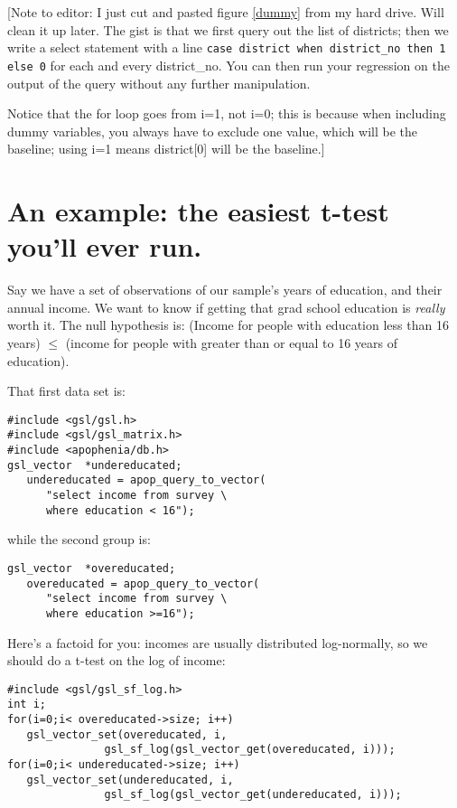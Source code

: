 
[Note to editor: I just cut and pasted figure \ref{dummy} from my hard drive. Will clean it up
later. The gist is that we first query out the list of districts; then we write a
select statement with a line {\tt case district when district\_no then 1 else 0} for
each and every district\_no. You can then run your regression on the output of the
query without any further manipulation.

Notice that the for loop goes from i=1, not i=0; this is because when including
dummy variables, you always have to exclude one value, which will be the baseline;
using i=1 means district[0] will be the baseline.]




\section{An example: the easiest t-test you'll ever run.}
Say we have a set of observations of our sample's years of education, and their annual income. We want to
know if getting that grad school education is {\it really} worth it. The null hypothesis is: (Income for
people with education less than 16 years) $\leq$ (income for people with greater than or equal to 16 years
of education).

That first data set is:
\begin{verbatim}
#include <gsl/gsl.h>
#include <gsl/gsl_matrix.h>
#include <apophenia/db.h>
gsl_vector	*undereducated;
   undereducated = apop_query_to_vector(
      "select income from survey \
      where education < 16");
\end{verbatim}
while the second group is:
\begin{verbatim}
gsl_vector	*overeducated;
   overeducated = apop_query_to_vector(
      "select income from survey \
      where education >=16");
\end{verbatim}

Here's a factoid for you: incomes are usually distributed log-normally, so we should do a t-test on the
log of income:
\begin{verbatim}
#include <gsl/gsl_sf_log.h>
int i;
for(i=0;i< overeducated->size; i++)
   gsl_vector_set(overeducated, i, 
               gsl_sf_log(gsl_vector_get(overeducated, i)));
for(i=0;i< undereducated->size; i++)
   gsl_vector_set(undereducated, i, 
               gsl_sf_log(gsl_vector_get(undereducated, i)));
\end{verbatim}

